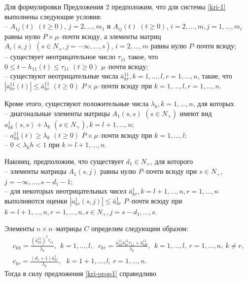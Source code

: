 Для формулировки Предложения 2 предположим, что для системы \eqref{kri-1}
выполнены следующие условия:\\
\noindent
  -- $A_{1j}(t) \,\, (t \geq 0)$, $j = 2,...,m_1$ и $A_{ij}(t) \,\, (t
\geq 0)$, $i = 2,...,m, j = 1,...,m_i$ равны нулю $P\times
\mu$--почти всюду, а элементы матриц $A_i(s,j)\,\, (s \in N_+,
j=-\infty,...,s)$, $i=2,...,m$  равны нулю $P$--почти всюду;\\
  -- существует неотрицательное число $\tau_{11}$ такое, что $0 \leq
t- h_{11}(t) \leq \tau _{11} {\,} {\,} (t \geq 0)$ $\mu $--почти
всюду;\\
  -- существуют неотрицательные числа $\bar
a^{11}_{kr}, k =1,...,l, r = 1,...,n$,  такие, что
  $|a^{11}_{kr}(t)|\leq \bar a^{11}_{kr} \,\, (t\geq 0) $
$P\times\mu$--почти всюду при $k =1,...,l, r = 1,...,n$.

 Кроме этого, существуют положительные числа $\lambda _k, k = 1, ..., n$, для которых\\
 \noindent
-- диагональные элементы матрицы $ A_1(s,s)$
$(s \in N_+)$ имеют вид $a_{kk}^{1}(s,s) + \lambda _k \,\, (s \in
N_+), k=l + 1, ..., n$;\\
   -- $a^{11}_{kk}(t) \geq \lambda _k \,\, (t\geq 0)$
$P\times\mu$--почти всюду при $k = 1,...,l$;\\
   -- $0 < \lambda _kh < 1$ при $ k = l + 1, ..., n$.

 Наконец, предположим, что существует $d_1 \in N_+$, для которого\\
 \noindent
  -- элементы
матрицы $A_1(s,j)$ равны нулю $P$--почти всюду при $ s \in N_+$,
$j=-\infty,...,s-d_1-1$;\\
 -- для некоторых неотрицательных чисел $\bar a^1_{kr}, k = l+1, ...,
n, r = 1,...,n$ выполняются оценки $|a^1_{kr}(s,j)| \leq \bar
a^1_{kr}$ $P$--почти всюду при $ k = l+1, ..., n, r = 1,...,n, s\in
N_+, j=s-d_1,...,s $.

Элементы $n\times n$--матрицы $C$ определим следующим образом:
$$
\begin{array}{crl}
c_{kk} = \frac{(\bar a^{11}_{kk})^2\tau_{11}}{\lambda _k }, \ \ k =
1,...,l, \ \ \ c_{kr} = \frac{\bar a^{11}_{kk}\bar a^{11}_{kr}\tau
_{11} + \bar a^{11}_{kR}}{\lambda _k }, \ \ k =
1,...,l,\ r = 1, ..., n, \ k \neq r,\\
 c_{kr} = \frac{(d_1+1)\bar a^{1}_{kr}}{\lambda_k}, \ \ \ k = 1 + 1,...,l, \ r = 1, ...,
 n.
\end {array}
$$
Тогда в силу предложения \ref{kri-prop1} справедливо

